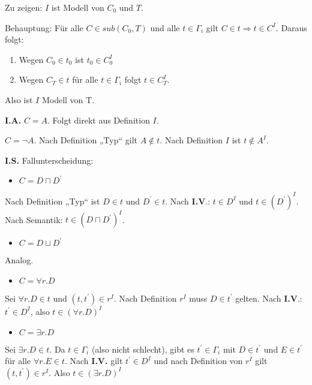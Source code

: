 Zu zeigen: $I$ ist Modell von $C_{0}$ und $T$.

Behauptung: Für alle $C \in sub\left( C_{0},T \right)$ und alle
$t \in \Gamma_{i}$ gilt $C \in t \Rightarrow t \in C^{I}$. Daraus
folgt:

\begin{enumerate}
\def\labelenumi{\arabic{enumi}.}
\item
  Wegen $C_{0} \in t_{0}$ ist $t_{0} \in C_{0}^{I}$
\item
  Wegen $C_{T} \in t$ für alle $t \in \Gamma_{i}$ folgt
  $t \in C_{T}^{I}$.
\end{enumerate}

Also ist $I$ Modell von $\text{T.}$

\textbf{I.A.} $C = A$. Folgt direkt aus Definition $I$.

$C = \neg A$. Nach Definition „Typ`` gilt $A \notin t$. Nach
Definition $I$ ist $t \notin A^{I}$.

\textbf{I.S.} Fallunterscheidung:

\begin{itemize}
\item
  $C = D \sqcap D^{'}$
\end{itemize}

Nach Definition „Typ`` ist $D \in t$ und $D^{'} \in t$. Nach
\textbf{I.V}.: $t \in D^{I}$ und $t \in \left( D^{'} \right)^{I}$.
Nach Semantik: $t \in \left( D \sqcap D^{'} \right)^{I}$.

\begin{itemize}
\item
  $C = D \sqcup D^{'}$
\end{itemize}

Analog.

\begin{itemize}
\item
  $C = \forall r.D$
\end{itemize}

Sei $\forall r.D \in t$ und $\left( t,t^{'} \right) \in r^{I}$. Nach
Definition $r^{I}$ muss $D \in t^{'}$ gelten. Nach \textbf{I.V}.:
$t^{'} \in D^{I}$, also $t \in \left( \forall r.D \right)^{I}$

\begin{itemize}
\item
  $C = \exists r.D$
\end{itemize}

Sei $\exists r.D \in t$. Da $t \in \Gamma_{i}$ (also nicht
schlecht), gibt es $t^{'} \in \Gamma_{i}$ mit $D \in t^{'}$ und
$E \in t^{'}$ für alle $\forall r.E \in t$. Nach \textbf{I.V.} gilt
$t^{'} \in D^{I}$ und nach Definition von $r^{I}$ gilt
$\left( t,t^{'} \right) \in r^{I}$. Also
$t \in \left( \exists r.D \right)^{I}$

